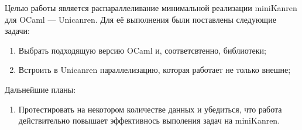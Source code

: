 
\label{sec:task}
 Целью работы является распараллеливание минимальной реализации miniKanren для OCaml --- Unicanren. Для её выполнения были поставлены следующие задачи:
 \begin{enumerate}
 \item  Выбрать подходящую версию OCaml и, соответсвтенно, библиотеки;
 \item  Встроить в Unicanren параллелизацию, которая работает не только внешне;
\end{enumerate}
Дальнейшие планы:
\begin{enumerate}
    \item  Протестировать на некотором количестве данных и убедиться, что
    работа действительно повышает эффективнось выполения задач на miniKanren.
   \end{enumerate}